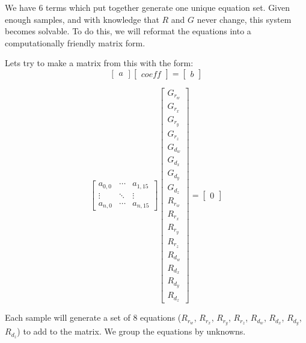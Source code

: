 \documentclass[12pt]{article}
\begin{document}
	We have 6 terms which put together generate one unique equation set. Given enough samples, and with knowledge that $R$ and $G$ never change, this system becomes solvable. To do this, we will reformat the equations into a computationally friendly matrix form. 
	
	Lets try to make a matrix from this with the form:
	\begin{equation}
		\begin{bmatrix}
			a
		\end{bmatrix}
		\begin{bmatrix}
			coeff
		\end{bmatrix}
		=
		\begin{bmatrix}
			b
		\end{bmatrix}
		\label{eq:generalFormMatrix}
	\end{equation}
		
	\begin{equation}
		\begin{bmatrix}
			a_{0,0} & \cdots & a_{1,15} \\
			\vdots  & \ddots & \vdots   \\
			a_{n,0} & \cdots & a_{n,15} 
		\end{bmatrix}
		\begin{bmatrix}
			G_{r_w} \\
			G_{r_x} \\
			G_{r_y} \\
			G_{r_z} \\
			G_{d_w} \\
			G_{d_x} \\
			G_{d_y} \\
			G_{d_z} \\
			R_{r_w} \\
			R_{r_x} \\
			R_{r_y} \\
			R_{r_z} \\
			R_{d_w} \\
			R_{d_x} \\
			R_{d_y} \\
			R_{d_z}
		\end{bmatrix}
		=
		\begin{bmatrix}
			0
		\end{bmatrix}
		\label{eq:generalMatrix}
	\end{equation}
	
	Each sample will generate a set of 8 equations ($R_{r_w}$, $R_{r_x}$, $R_{r_y}$, $R_{r_z}$, $R_{d_w}$, $R_{d_x}$, $R_{d_y}$, $R_{d_z}$) to add to the matrix. We group the equations by unknowns. 
	
\end{document}
